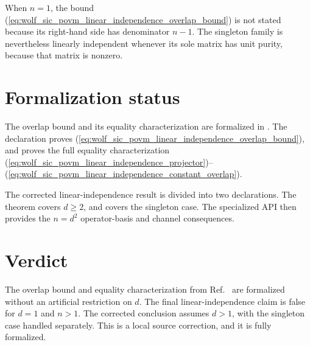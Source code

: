 \documentclass{article}
\begin{document}
When $n=1$, the bound
(\ref{eq:wolf_sic_povm_linear_independence_overlap_bound}) is not stated
because its right-hand side has denominator $n-1$. The singleton family is
nevertheless linearly independent whenever its sole matrix has unit purity,
because that matrix is nonzero.

\section{Formalization status}

The overlap bound and its equality characterization are formalized in
. The declaration
 proves
(\ref{eq:wolf_sic_povm_linear_independence_overlap_bound}), and
 proves the full equality
characterization
(\ref{eq:wolf_sic_povm_linear_independence_projector})--%
(\ref{eq:wolf_sic_povm_linear_independence_constant_overlap}).

The corrected linear-independence result is divided into two declarations.
The theorem
 covers $d\geq2$,
and
 covers the
singleton case. The specialized  API then provides the
$n=d^2$ operator-basis and channel consequences.

\section{Verdict}

The overlap bound and equality characterization from
Ref.~\cite{Wolf2012Quantum} are formalized without an artificial restriction
on $d$. The final linear-independence claim is false for $d=1$ and $n>1$.
The corrected conclusion assumes $d>1$, with the singleton case handled
separately. This is a local source correction, and it is fully formalized.



\end{document}
